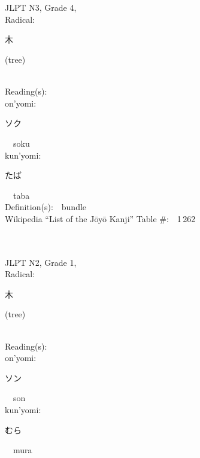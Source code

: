 \begin{multicols}{2}
\ \ \\
{\fontsize{34pt}{40pt}  }\ \ \\  %
{JLPT N3, Grade 4, \\Radical:\ \ {\begin{CJK}{UTF8}{min} 木 \end{CJK}} (tree) } \\
Reading(s):\ \ \\
{\hspace*{1em}}on'yomi:\ \ \\
{\hspace*{2em}}{\begin{CJK}{UTF8}{min} ソク \end{CJK}}\ \ soku\ \ \\
{\hspace*{1em}}kun'yomi:\ \ \\
{\hspace*{2em}}{\begin{CJK}{UTF8}{min} たば \end{CJK}}\ \ taba\ \ \\
Definition(s):\ \ bundle \\
Wikipedia ``List of the J\=oy\=o Kanji'' Table \#:\ \ 1\,262 \\
\ \ \\
{\fontsize{34pt}{40pt}  }\ \ \\  %
{JLPT N2, Grade 1, \\Radical:\ \ {\begin{CJK}{UTF8}{min} 木 \end{CJK}} (tree) } \\
Reading(s):\ \ \\
{\hspace*{1em}}on'yomi:\ \ \\
{\hspace*{2em}}{\begin{CJK}{UTF8}{min} ソン \end{CJK}}\ \ son\ \ \\
{\hspace*{1em}}kun'yomi:\ \ \\
{\hspace*{2em}}{\begin{CJK}{UTF8}{min} むら \end{CJK}}\ \ mura\ \ \\

\end{multicols}
